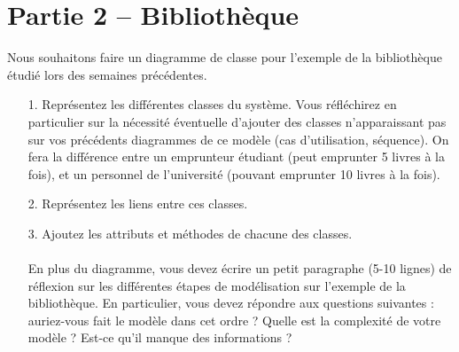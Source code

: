 \documentclass[12pt]{article}
\begin{document}
\section{Partie 2 – Bibliothèque}
Nous souhaitons faire un diagramme de classe pour l’exemple de la bibliothèque étudié lors des
semaines précédentes.
\begin{itemize}
	\item[1. ] Représentez les différentes classes du système. Vous réfléchirez en particulier sur la
	nécessité éventuelle d’ajouter des classes n’apparaissant pas sur vos précédents diagrammes
	de ce modèle (cas d’utilisation, séquence). On fera la différence entre un emprunteur
	étudiant (peut emprunter 5 livres à la fois), et un personnel de l’université (pouvant
	emprunter 10 livres à la fois).
	\item[2. ] Représentez les liens entre ces classes.
	\item[3. ] Ajoutez les attributs et méthodes de chacune des classes.\\
	\\
	En plus du diagramme, vous devez écrire un petit paragraphe (5-10 lignes) de réflexion sur les
	différentes étapes de modélisation sur l’exemple de la bibliothèque. En particulier, vous devez
	répondre aux questions suivantes : auriez-vous fait le modèle dans cet ordre ? Quelle est la
	complexité de votre modèle ? Est-ce qu’il manque des informations ?
\end{itemize}
	
\end{document}
